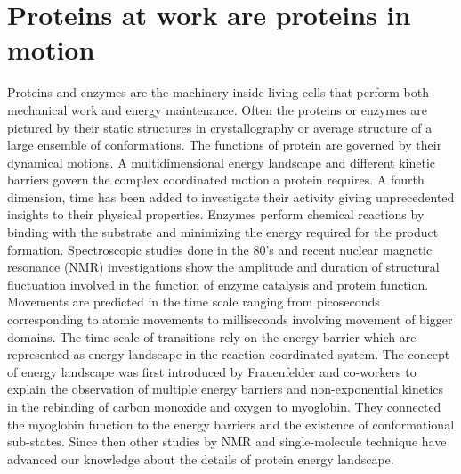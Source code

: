 \documentclass[11pt,a4paper,onecolumn]{article}
\begin{document}
\section{Proteins at work are  proteins in motion}
Proteins and enzymes are the machinery inside living cells that perform both mechanical work and energy maintenance.
Often the proteins or enzymes are pictured by their static structures in crystallography or average structure of a large ensemble of conformations.
The functions of protein are governed by their dynamical motions.
A multidimensional energy landscape and different kinetic barriers govern the complex coordinated motion a protein requires.
A fourth dimension, time has been added to investigate their activity giving unprecedented insights to their physical properties.
Enzymes perform chemical reactions by binding with the substrate and minimizing the energy required for the product formation.
Spectroscopic studies done in the 80's and recent nuclear magnetic resonance (NMR) investigations show the amplitude and duration of structural fluctuation involved in the function of enzyme catalysis and protein function.
Movements are predicted in the time scale ranging from picoseconds corresponding to atomic movements to milliseconds involving movement of bigger domains.\cite{henzler-wildman2007dynamic,frauenfelder1991the}
The time scale of transitions rely on the energy barrier which are represented as energy landscape in the reaction coordinated system.
The concept of energy landscape was first introduced by Frauenfelder and co-workers\cite{frauenfelder1991the} to explain the observation of multiple energy barriers and non-exponential kinetics in the rebinding of carbon monoxide and oxygen to myoglobin.
They connected the myoglobin function to the energy barriers and the existence of conformational sub-states.
Since then other studies by NMR and single-molecule technique have advanced our knowledge about the details of protein energy landscape.
\end{document}

